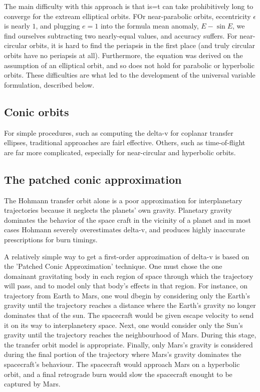 \documentclass[12pt]{article}
\begin{document}
The main difficulty with this approach is that is=t can take prohibitively long to converge for the extream elliptical orbits. FOr near-parabolic orbits, eccentricity \(\epsilon\) is nearly \(1\), and plugging \(e=1\) into the formula mean anomaly, \(E - \sin E\), we find ourselves subtracting two nearly-equal values, and accuracy suffers. For near-circular orbits, it is hard to find the periapsis in the first place (and truly circular orbits have no periapsis at all). Furthermore, the equation was derived on the assumption of an elliptical orbit, and so does not hold for parabolic or hyperbolic orbits. These difficulties are what led to the development of the universal variable formulation, described below.

\subsection{Conic orbits}

For simple procedures, such as computing the delta-v for coplanar transfer ellipses, traditional approaches are fairl effective. Others, such as time-of-flight are far more complicated, especially for near-circular and hyperbolic orbits.

\subsection{The patched conic approximation}

The Hohmann transfer orbit alone is a poor approximation for interplanetary trajectories because it neglects the planets' own gravity. Planetary gravity dominates the behavior of the space craft in the vicinity of a planet and in most cases Hohmann severely overestimates delta-v, and produces highly inaccurate prescriptions for burn timings.

A relatively simple way to get a first-order approzimation of delta-v is based on the 'Patched Conic Approximation' technique. One must chose the one domainant gravitating body in each region of space through which the trajectory will pass, and to model only that body's effects in that region. For instance, on trajectory from Earth to Mars, one woul dbegin by considering only the Earth's gravity until the trajectory reaches a distance where the Earth's gravity no longer dominates that of the sun. The spacecraft would be given escape velocity to send it on its way to interplanetery space. Next, one would consider only the Sun's gravity until the trajectory reaches the neighbourhood of Mars. During this stage, the transfer orbit model is appropriate. Finally, only Mars's gravity is considered during the final portion of the trajectory where Mars's gravity dominates the spacecraft's behaviour. The spacecraft would approach Mars on a hyperbolic orbit, and a final retrograde burn would slow the spacecraft enought to be captured by Mars.
\end{document}
